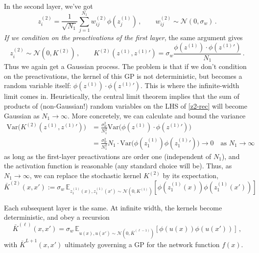 \documentclass[11pt]{article}
\newcommand{\E}{\mathbb{E}}
\newcommand{\CN}{{\mathcal N}}
\begin{document}
In the second layer, we've got
%
\begin{equation} 
z_i^{(2)} = \frac{1}{\sqrt{N_1}}\sum_{j=1}^{N_1} w_{ij}^{(2)}\phi(z_j^{(1)})\,,\qquad w_{ij}^{(2)}\sim \CN(0,\sigma_w)\,. \label{z2-rec}
\end{equation}
%
\emph{If we condition on the preactivations of the first layer}, the same argument gives
%
\begin{equation}
    z_i^{(2)} \sim \CN(0,K^{(2)})\,,\qquad K^{(2)}(z^{(1)},z^{(1)}{}') = \sigma_w\frac{\phi(z^{(1)})\cdot \phi(z^{(1)}{}')}{N_1}\,. \label{K2-rec}
\end{equation}
%
Thus we again get a Gaussian process. The problem is that if we don't condition on the preactivations, the kernel of this GP is not deterministic, but becomes a random variable itself: $\phi(z^{(1)})\cdot \phi(z^{(1)}{}')$. This is where the infinite-width limit comes in. Heuristically, the central limit theorem implies that the sum of products of (non-Gaussian!) random variables on the LHS of \eqref{z2-rec} will become Gaussian as $N_1\to\infty$. More concretely, we can calculate and bound the variance
%
\begin{align}
  \text{Var}\big(K^{(2)}(z^{(1)},z^{(1)}{}')\big) &= \frac{\sigma_w^2}{N_1^2} \text{Var}\big(\phi(z^{(1)})\cdot \phi(z^{(1)}{}')\big) \\  &= \frac{\sigma_w^2}{N_1^2} N_1 \cdot \text{Var}\big(\phi(z_1^{(1)}) \phi(z_1^{(1)}{}')\big) \to 0 \quad\text{as $N_1\to\infty$}
\end{align}
%
as long as the first-layer preactivations are order one (independent of $N_1$), and the activation function is reasonable (any standard choice will be). Thus, as $N_1\to\infty$, we can replace the stochastic kernel $K^{(2)}$ by its expectation,
%
\begin{equation} \bar K^{(2)}(x,x') := \sigma_w \, \E_{z_1^{(1)}(x),z_1^{(1)}(x')\sim  \CN(0,K^{(1)})} [ \phi(z_1^{(1)}(x)) \phi(z_1^{(1)}(x')) ] \end{equation}

Each subsequent layer is the same. At infinite width, the kernels become deterministic, and obey a recursion
%
\begin{equation} \bar K^{(\ell)}(x,x') = \sigma_w\, \E_{u(x),u(x') \sim  \CN(0,\bar K^{(\ell-1)})} [ \phi(u(x)) \phi(u(x')) ]\,, \label{Kbar-rec}
\end{equation}
%
with $\bar K^{L+1}(x,x')$ ultimately governing a GP for the network function $f(x)$.
\end{document}
